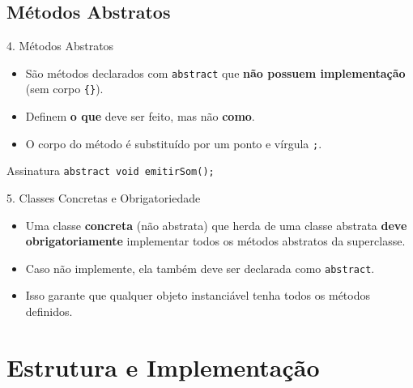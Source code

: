 \documentclass[9pt]{beamer}
\begin{document}
\subsection{Métodos Abstratos}
\begin{frame}{4. Métodos Abstratos}
    \begin{itemize}
        \item São métodos declarados com \texttt{abstract} que \textbf{não possuem implementação} (sem corpo \texttt{\{\}}).
        \item Definem \textbf{o que} deve ser feito, mas não \textbf{como}.
        \item O corpo do método é substituído por um ponto e vírgula \texttt{;}.
    \end{itemize}
    \begin{exampleblock}{Assinatura}
        \texttt{abstract void emitirSom();}
    \end{exampleblock}
\end{frame}

\begin{frame}{5. Classes Concretas e Obrigatoriedade}
    \begin{itemize}
        \item Uma classe \textbf{concreta} (não abstrata) que herda de uma classe abstrata \textbf{deve obrigatoriamente} implementar todos os métodos abstratos da superclasse.
        \item Caso não implemente, ela também deve ser declarada como \texttt{abstract}.
        \item Isso garante que qualquer objeto instanciável tenha todos os métodos definidos.
    \end{itemize}
\end{frame}

\section{Estrutura e Implementação}
\end{document}
